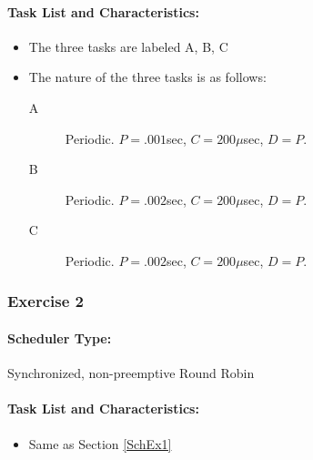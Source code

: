\paragraph{Task List and Characteristics:} 

\begin{itemize}
\item The three tasks are labeled A, B, C
\item The nature of the three tasks is as follows:
    \begin{description}
      \item [A] Periodic. $P = .001$sec, $C = 200\mu$sec, $D =P$.
      \item [B] Periodic. $P = .002$sec, $C = 200\mu$sec, $D =P$.
      \item [C] Periodic. $P = .002$sec, $C = 200\mu$sec, $D =P$.
    \end{description}
\end{itemize}


\subsubsection{Exercise 2}

\paragraph{Scheduler Type:} Synchronized, non-preemptive Round Robin
\paragraph{Task List and Characteristics:} 
\begin{itemize}
\item Same as Section \ref{SchEx1}
\end{itemize}
%


